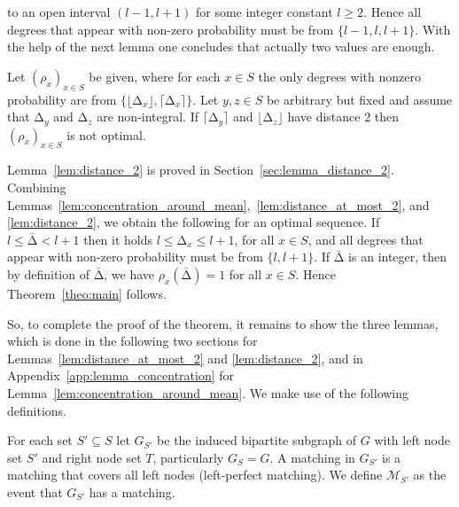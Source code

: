 \let\accentvec\vec \documentclass{llncs}
\newcommand{\pmf}{\ensuremath{{\rho}}}
\newcommand{\mean}{{\mathrm{\scriptstyle\Delta}}}
\newcommand{\Amean}{\bar{\mean}}
\newcommand{\floor}[1]{\ensuremath{\lfloor #1\rfloor}}
\newcommand{\ceil}[1]{\ensuremath{\lceil #1\rceil}}
\newcommand{\graph}{\ensuremath{G}}
\newcommand{\low}{\ensuremath{l}}
\newcommand{\evM}{{\mathcal{M}}}
\begin{document}
to an open interval $(\low-1,\low+1)$ for some integer constant $\low\geq 2$. 
Hence all degrees that appear with non-zero probability must be from $\{\low-1,\low,\low+1\}$.
With the help of the next lemma one concludes that actually two values are enough.
\begin{lemma}
\label{lem:distance_2}
Let $(\pmf_x)_{x\in S}$ be given, where for each $x\in S$ the only degrees with 
nonzero probability are from $\{\floor{\mean_x},\ceil{\mean_x}\}$. 
Let $y,z\in S$ be arbitrary but fixed and assume that $\mean_y$ and $\mean_z$ are non-integral.
If $\ceil{\mean_y}$ and $\floor{\mean_z}$ have distance $2$ then $(\pmf_x)_{x\in S}$ is not optimal.
\end{lemma}
Lemma~\ref{lem:distance_2} is proved in Section~\ref{sec:lemma_distance_2}.
Combining Lemmas~\ref{lem:concentration_around_mean},~\ref{lem:distance_at_most_2}, and \ref{lem:distance_2},
we obtain the following for an optimal sequence.
If $\low \leq \Amean <\low +1$ then it holds $\low \leq \mean_x \leq \low+1$, for all $x \in S$,
and all degrees that appear with non-zero probability must be from $\{\low,\low+1\}$.
If $\Amean$ is an integer, then by definition of $\Amean$, we have $\pmf_x(\Amean)=1$ for all $x\in S$.
Hence Theorem~\ref{theo:main} follows.


So, to complete the proof of the theorem, it remains to show the three lemmas, which
is done in the following two sections for Lemmas~\ref{lem:distance_at_most_2} and \ref{lem:distance_2}, and 
in
\ifnum{}
Appendix~\ref{app:lemma_concentration}
\else
\cite[Appendix A]{full_version}
\fi
for Lemma~\ref{lem:concentration_around_mean}.
We make use of the following definitions.

For each set $S'\subseteq S$ let $\graph_{S'}$ be the induced bipartite subgraph of $\graph$ with
left node set $S'$ and right node set ${T}$, particularly $\graph_S=\graph$.
A matching in $\graph_{S'}$ is a matching that covers all left nodes (left-perfect matching).
We define $\evM_{S'}$ as the event that $\graph_{S'}$ has a matching.
\end{document}
